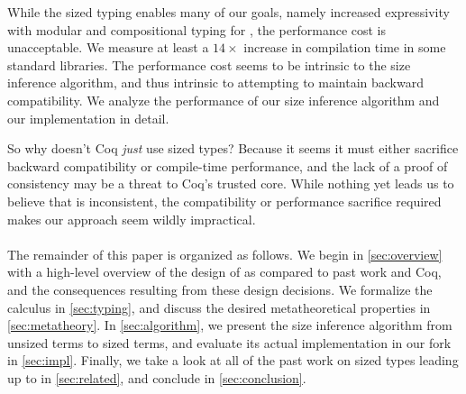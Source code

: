 While the sized typing enables many of our goals, namely increased expressivity with modular and compositional typing for \cofixpoints, the performance cost is unacceptable.
We measure at least a $14\times$ increase in compilation time in some standard libraries.
The performance cost seems to be intrinsic to the size inference algorithm, and thus intrinsic to attempting to maintain backward compatibility.
We analyze the performance of our size inference algorithm and our implementation in detail.

So why doesn't Coq \emph{just} use sized types?
Because it seems it must either sacrifice backward compatibility or compile-time performance,
and the lack of a proof of consistency may be a threat to Coq's trusted core.
While nothing yet leads us to believe that \lang is inconsistent,
the compatibility or performance sacrifice required makes our approach seem wildly impractical.

\paragraph*{} The remainder of this paper is organized as follows.
We begin in \autoref{sec:overview} with a high-level overview of the design of \lang as compared to past work and Coq,
and the consequences resulting from these design decisions.
We formalize the calculus \lang in \autoref{sec:typing},
and discuss the desired metatheoretical properties in \autoref{sec:metatheory}.
In \autoref{sec:algorithm}, we present the size inference algorithm from unsized terms to sized \lang terms,
and evaluate its actual implementation in our fork in \autoref{sec:impl}.
Finally, we take a look at all of the past work on sized types leading up to \lang in \autoref{sec:related}, and conclude in \autoref{sec:conclusion}.


